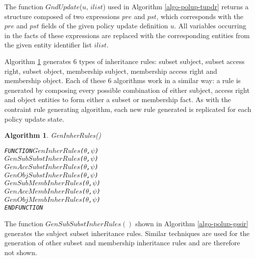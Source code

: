 \documentclass[11pt]{report}
\newenvironment{vverbatim}
{
  \begin{alltt}
}
{
    \vspace{-\baselineskip}
  \end{alltt}
}
\newtheorem{vvalgorithm}{Algorithm}[chapter]
\newenvironment{valgorithm}[2]
{
  \begin{vvalgorithm}{#1}
    \label{#2}
    \small
    \begin{vverbatim}
}
{
    \end{vverbatim}
  \end{vvalgorithm}
}
\begin{document}
          The function $GndUpdate$($u$, $ilist$) used in Algorithm
          \ref{algo-polup-tupdr} returns a structure composed of two
          expressions $pre$ and $pst$, which corresponds with the $pre$ and
          $pst$ fields of the given policy update definition $u$. All
          variables occurring in the facts of these expressions are replaced
          with the corresponding entities from the given entity identifier list
          $ilist$.

          Algorithm \ref{algo-polup-ginhr} generates 6 types of inheritance
          rules: subset subject, subset access right, subset object, membership
          subject, membership access right and membership object. Each of
          these 6 algorithms work in a similar way: a rule is generated by
          composing every possible combination of either subject, access right
          and object entities to form either a subset or membership fact. As
          with the contraint rule generating algorithm, each new rule
          generated is replicated for each policy update state.

          \begin{valgorithm}{GenInherRules()}{algo-polup-ginhr}
FUNCTION \(GenInherRules\)(\(\theta\), \(\psi\))
  \(GenSubSubstInherRules\)(\(\theta\), \(\psi\))
  \(GenAccSubstInherRules\)(\(\theta\), \(\psi\))
  \(GenObjSubstInherRules\)(\(\theta\), \(\psi\))
  \(GenSubMembInherRules\)(\(\theta\), \(\psi\))
  \(GenAccMembInherRules\)(\(\theta\), \(\psi\))
  \(GenObjMembInherRules\)(\(\theta\), \(\psi\))
ENDFUNCTION
          \end{valgorithm}

          The function $GenSubSubstInherRules()$ shown in Algorithm
          \ref{algo-polup-gssir} generates the subject subset inheritance
          rules. Similar techniques are used for the generation of other
          subset and membership inheritance rules and are therefore not shown.
\end{document}
